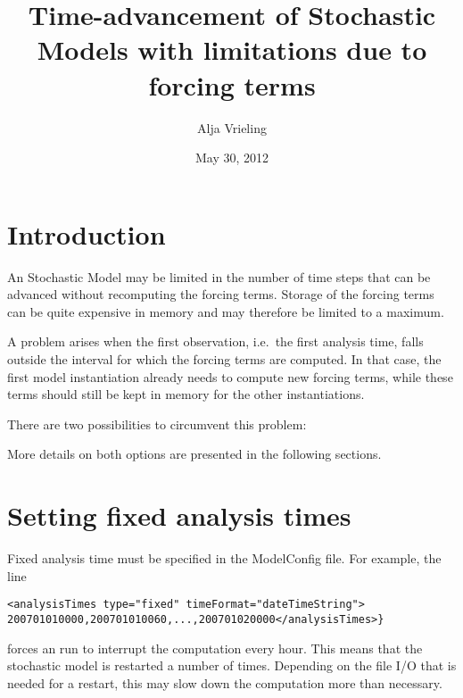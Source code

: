\documentclass[12pt]{article}
\title{Time-advancement of Stochastic Models with limitations due to forcing terms}
\author{Alja Vrieling}
\date{May 30, 2012}
\begin{document}
\maketitle

\section{Introduction}

An \oda Stochastic Model may be limited in the number of time steps that can
be advanced without recomputing the forcing terms. Storage of the forcing terms
can be quite expensive in memory and may therefore be limited to a maximum.

A problem arises when the first observation, i.e.\ the first analysis time,
falls outside the interval for which the forcing terms are computed. In that
case, the first model instantiation already needs to compute new forcing terms,
while these terms should still be kept in memory for the other instantiations.

There are two possibilities to circumvent this problem:
More details on both options are presented in the following sections.

\section{Setting fixed analysis times}

Fixed analysis time must be specified in the ModelConfig file. For example, the
line
\begin{verbatim}
<analysisTimes type="fixed" timeFormat="dateTimeString">
200701010000,200701010060,...,200701020000</analysisTimes>}
\end{verbatim}
forces an \oda run to interrupt the computation every hour. This means that
the stochastic model is restarted a number of times. Depending on the file I/O
that is needed for a restart, this may slow down the \oda computation more
than necessary.
\end{document}
